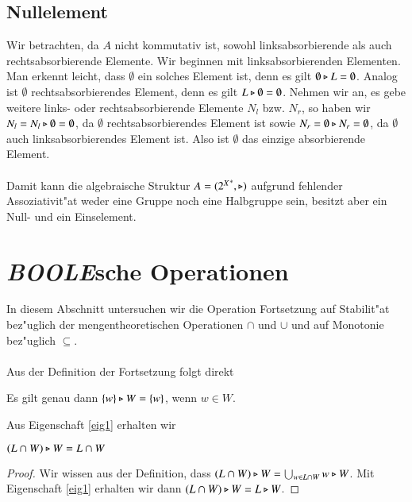 \subsection{Nullelement}
Wir betrachten, da $A$ nicht kommutativ ist, sowohl linksabsorbierende als auch rechtsabsorbierende Elemente.
Wir beginnen mit linksabsorbierenden Elementen.
Man erkennt leicht, dass $\emptyset$ ein solches Element ist, denn es gilt $\emptyset\triangleright L = \emptyset$.
Analog ist $\emptyset$ rechtsabsorbierendes Element, denn es gilt $L\triangleright\emptyset =\emptyset$.
Nehmen wir an, es gebe weitere links- oder rechtsabsorbierende Elemente $N_l$ bzw. $N_r$, so haben wir $N_l = N_l\triangleright \emptyset = \emptyset$, da $\emptyset$ rechtsabsorbierendes Element ist sowie $N_r = \emptyset\triangleright N_r = \emptyset$, da $\emptyset$ auch linksabsorbierendes Element ist. Also ist $\emptyset$ das einzige absorbierende Element.\\\\
Damit kann die algebraische Struktur $A=({2^X}^*,\triangleright)$ aufgrund fehlender Assoziativit"at weder eine Gruppe noch eine Halbgruppe sein, besitzt aber ein Null- und ein Einselement.

\section{\emph{BOOLE}sche Operationen}
In diesem Abschnitt untersuchen wir die Operation Fortsetzung auf Stabilit"at bez"uglich der mengentheoretischen Operationen $\cap$ und $\cup$ und auf Monotonie bez"uglich $\subseteq$.
\\\\Aus der Definition der Fortsetzung folgt direkt

\vspace{2ex}

\begin{eigen}\label{eig1}
Es gilt genau dann $\{w\} \triangleright W = \{w\}$, wenn $w\in W$.
\end{eigen}

Aus Eigenschaft \ref{eig1} erhalten wir

\vspace{2ex}

\begin{eigen}\label{eigvereinfach}
$(L\cap W) \triangleright W = L\cap W$
\end{eigen}
\begin{proof}
Wir wissen aus der Definition, dass $(L\cap W)\triangleright W = \bigcup_{w\in L\cap W} w\triangleright W$. Mit Eigenschaft \ref{eig1} erhalten wir dann $(L\cap W)\triangleright W = L\triangleright W$.
\end{proof}

